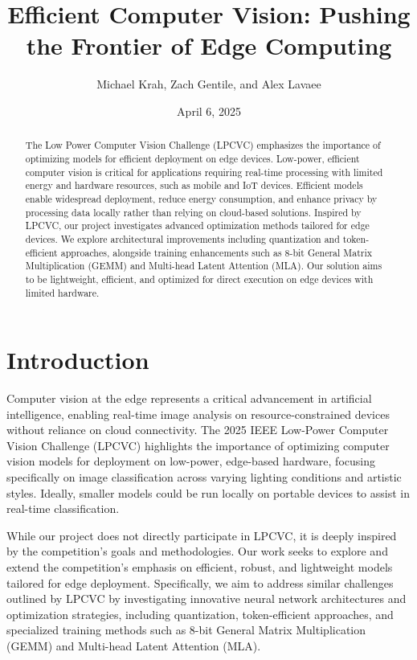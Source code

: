 \documentclass[11pt, oneside]{article}   	%
\title{Efficient Computer Vision: Pushing the Frontier of Edge Computing}
\author{Michael Krah, Zach Gentile, and Alex Lavaee}
\date{April 6, 2025}
\begin{document}
\maketitle
\begin{abstract}
	The Low Power Computer Vision Challenge (LPCVC) emphasizes the importance of optimizing models for efficient deployment on edge devices. Low-power, efficient computer vision is critical for applications requiring real-time processing with limited energy and hardware resources, such as mobile and IoT devices. Efficient models enable widespread deployment, reduce energy consumption, and enhance privacy by processing data locally rather than relying on cloud-based solutions. Inspired by LPCVC, our project investigates advanced optimization methods tailored for edge devices. We explore architectural improvements including quantization and token-efficient approaches, alongside training enhancements such as 8-bit General Matrix Multiplication (GEMM) and Multi-head Latent Attention (MLA). Our solution aims to be lightweight, efficient, and optimized for direct execution on edge devices with limited hardware.


\end{abstract}

\section*{Introduction}

Computer vision at the edge represents a critical advancement in artificial intelligence, enabling real-time image analysis on resource-constrained devices without reliance on cloud connectivity. The 2025 IEEE Low-Power Computer Vision Challenge (LPCVC) highlights the importance of optimizing computer vision models for deployment on low-power, edge-based hardware, focusing specifically on image classification across varying lighting conditions and artistic styles. Ideally, smaller models could be run locally on portable devices to assist in real-time classification.

While our project does not directly participate in LPCVC, it is deeply inspired by the competition’s goals and methodologies. Our work seeks to explore and extend the competition’s emphasis on efficient, robust, and lightweight models tailored for edge deployment. Specifically, we aim to address similar challenges outlined by LPCVC by investigating innovative neural network architectures and optimization strategies, including quantization, token-efficient approaches, and specialized training methods such as 8-bit General Matrix Multiplication (GEMM) and Multi-head Latent Attention (MLA).
\end{document}
